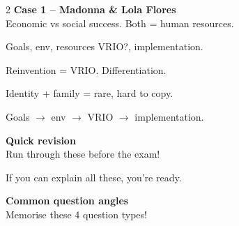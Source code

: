 \documentclass[8pt,landscape,a4paper]{article}
\begin{document}
\begin{multicols}{2}
\textbf{Case 1 -- Madonna \& Lola Flores}\\
Economic vs social success. Both = human resources.

Goals, env, resources VRIO?, implementation.

Reinvention = VRIO. Differentiation.

Identity + family = rare, hard to copy.

Goals $\to$ env $\to$ VRIO $\to$ implementation.

\textbf{Quick revision}\\
Run through these before the exam!

If you can explain all these, you're ready.

\textbf{Common question angles}\\
Memorise these 4 question types!

\end{multicols}
\vfill
\normalsize\normalfont\color{black}
\end{document}
